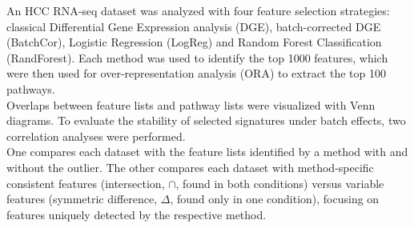 \begin{columns}
{
\linebreak\linebreak
An HCC RNA-seq dataset was analyzed with four feature selection strategies: classical Differential Gene Expression analysis (DGE), batch-corrected DGE (BatchCor), Logistic Regression (LogReg) and Random Forest Classification (RandForest). Each method was used to identify the top 1000 features, which were then used for over-representation analysis (ORA) to extract the top 100 pathways.\\Overlaps between feature lists and pathway lists were visualized with Venn diagrams. To evaluate the stability of selected signatures under batch effects, two correlation analyses were performed.\\One compares each dataset with the feature lists identified by a method with and without the outlier. The other compares each dataset with method-specific consistent features (intersection, $\cap$, found in both conditions) versus variable features (symmetric difference, $\Delta$, found only in one condition), focusing on features uniquely detected by the respective method.

}
\end{columns}

